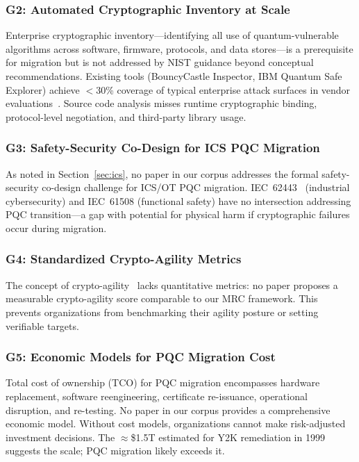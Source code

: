 \documentclass[journal]{IEEEtran}
\begin{document}
\subsubsection{G2: Automated Cryptographic Inventory at Scale}

Enterprise cryptographic inventory---identifying all use of quantum-vulnerable
algorithms across software, firmware, protocols, and data stores---is a
prerequisite for migration but is not addressed by NIST guidance beyond
conceptual recommendations. Existing tools (BouncyCastle Inspector, IBM
Quantum Safe Explorer) achieve $<$30\% coverage of typical enterprise attack
surfaces in vendor evaluations~\cite{xiao2023machine}. Source code analysis
misses runtime cryptographic binding, protocol-level negotiation, and
third-party library usage.

\subsubsection{G3: Safety-Security Co-Design for ICS PQC Migration}

As noted in Section~\ref{sec:ics}, no paper in our corpus addresses the formal
safety-security co-design challenge for ICS/OT PQC migration. IEC~62443~\cite{iec62443}
(industrial cybersecurity) and IEC~61508 (functional safety) have no
intersection addressing PQC transition---a gap with potential for physical harm
if cryptographic failures occur during migration.

\subsubsection{G4: Standardized Crypto-Agility Metrics}

The concept of crypto-agility~\cite{hoffman2022cryptoagility} lacks
quantitative metrics: no paper proposes a measurable crypto-agility score
comparable to our MRC framework. This prevents organizations from benchmarking
their agility posture or setting verifiable targets.

\subsubsection{G5: Economic Models for PQC Migration Cost}

Total cost of ownership (TCO) for PQC migration encompasses hardware
replacement, software reengineering, certificate re-issuance, operational
disruption, and re-testing. No paper in our corpus provides a comprehensive
economic model. Without cost models, organizations cannot make risk-adjusted
investment decisions. The $\approx$\$1.5T estimated for Y2K remediation
in 1999 suggests the scale; PQC migration likely exceeds it.
\end{document}
